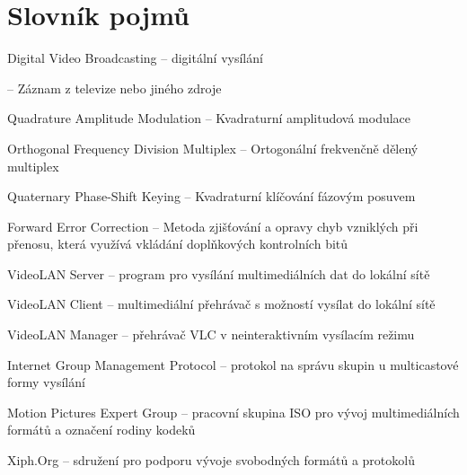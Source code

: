
\chapter{Slovník pojmů}
\bdesc
\item[DVB] Digital Video Broadcasting -- digitální vysílání
\item[GRAB] -- Záznam z televize nebo jiného zdroje
\item[QAM] Quadrature Amplitude Modulation -- Kvadraturní amplitudová modulace
\item[OFDM] Orthogonal Frequency Division Multiplex -- Ortogonální frekvenčně dělený multiplex
\item[QPSK] Quaternary Phase-Shift Keying -- Kvadraturní klíčování fázovým posuvem
\item[FEC] Forward Error Correction -- Metoda zjišťování a opravy chyb vzniklých při přenosu, která využívá vkládání doplňkových kontrolních bitů
\item[VLS] VideoLAN Server -- program pro vysílání multimediálních dat do lokální sítě
\item[VLC] VideoLAN Client -- multimediální přehrávač s možností vysílat do lokální sítě
\item[VLM] VideoLAN Manager -- přehrávač VLC v neinteraktivním vysílacím režimu 
\item[IGMP] Internet Group Management Protocol -- protokol na správu skupin u multicastové formy vysílání
\item[MPEG] Motion Pictures Expert Group -- pracovní skupina ISO pro vývoj multimediálních formátů a označení rodiny kodeků
\item[Xiph] Xiph.Org -- sdružení pro podporu vývoje svobodných formátů a protokolů
\edesc
